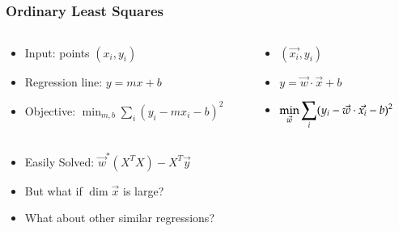 \subsection{}
\begin{frame}
\frametitle{Ordinary Least Squares}

\begin{columns}
  \begin{column}{0.6\textwidth}
    \begin{itemize}
    \item[] Input: points $(x_i, y_i)$
      \item[] Regression line: $y = mx + b$
\item[] Objective: $\displaystyle \min_{m, b} \sum_{i}(y_i - mx_i -b)^2$
    \end{itemize}
  \end{column}

  \begin{column}{0.5\textwidth}
    \begin{itemize}
    \item[] $(\vec{x_i}, y_i)$
    \item[] $y = \vec{w} \cdot \vec{x} + b$
    \item[] $\displaystyle \min_{\vec{w}}\sum_{i}(y_i - \vec{w} \cdot \vec{x_i} -b)^2$
    \end{itemize}

  \end{column}
\end{columns}

\begin{itemize}
\item Easily Solved: $\vec{w}^*(X^TX)-X^T\vec{y}$
\item But what if $\dim\vec{x} $ is large?
\item What about other similar regressions?
\end{itemize}

\end{frame}

